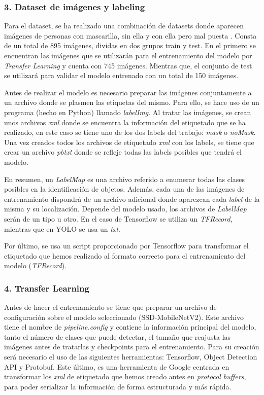 \vspace{-0.5cm}
\subsubsection*{3. Dataset de imágenes y labeling}
\vspace{-0.7cm}
Para el dataset, se ha realizado una combinación de datasets donde aparecen imágenes de personas con mascarilla, sin ella y con ella pero mal puesta \cite{Cabani_2021} \cite{datasetMask}. Consta de un total de 895 imágenes, dividas en dos grupos train y test. En el primero se encuentran las imágenes que se utilizarán para el entrenamiento del modelo por \textit{Transfer Learning} y cuenta con 745 imágenes. Mientras que, el conjunto de test se utilizará para validar el modelo entrenado con un total de 150 imágenes.

Antes de realizar el modelo es necesario preparar las imágenes conjuntamente a un archivo donde se plasmen las etiquetas del mismo. Para ello, se hace uso de un programa (hecho en Python) llamado \textit{labelImg}. Al tratar las imágenes, se crean unos archivos \textit{xml} donde se encuentra la información del etiquetado que se ha realizado, en este caso se tiene uno de los dos labels del trabajo: \textit{mask} o \textit{noMask}. Una vez creados todos los archivos de etiquetado \textit{xml} con los labels, se tiene que crear un archivo \textit{pbtxt} donde se refleje todas las labels posibles que tendrá el modelo.

En resumen, un \textit{LabelMap} es una archivo referido a enumerar todas las clases posibles en la identificación de objetos. Además, cada una de las imágenes de entrenamiento dispondrá de un archivo adicional donde aparezcan cada \textit{label} de la misma y su localización. Depende del modelo usado, los archivos de \textit{LabelMap} serán de un tipo u otro. En el caso de Tensorflow se utiliza un \textit{TFRecord}, mientras que en YOLO se usa un \textit{txt}.

Por último, se usa un script proporcionado por Tensorflow para transformar el etiquetado que hemos realizado al formato correcto para el entrenamiento del modelo (\textit{TFRecord}).

\vspace{-0.5cm}
\subsubsection*{4. Transfer Learning}
\vspace{-0.7cm}
Antes de hacer el entrenamiento se tiene que preparar un archivo de configuración sobre el modelo seleccionado (SSD-MobileNetV2). Este archivo tiene el nombre de \textit{pipeline.config} y contiene la información principal del modelo, tanto el número de clases que puede detectar, el tamaño que reajusta las imágenes antes de tratarlas y checkpoints para el entrenamiento. Para su creación será necesario el uso de las siguientes herramientas: Tensorflow, Object Detection API y Protobuf. Este último, es una herramienta de Google centrada en transformar los \textit{xml} de etiquetado que hemos creado antes en \textit{protocol buffers}, para poder serializar la información de forma estructurada y más rápida.

